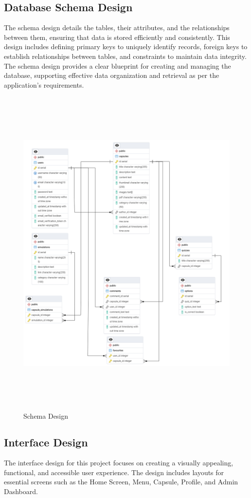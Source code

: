 \subsection{Database Schema Design}
The schema design details the tables, their attributes, and the relationships between them, ensuring that data is stored efficiently and consistently. This design includes defining primary keys to uniquely identify records, foreign keys to establish relationships between tables, and constraints to maintain data integrity. The schema design provides a clear blueprint for creating and managing the database, supporting effective data organization and retrieval as per the application’s requirements.
\begin{figure}[H]
   \centering
    \includegraphics[height = 17cm]{Diagrams/Schema Design.png}
    \caption{Schema Design}
\end{figure}
\newpage
\subsection{Interface Design}
The interface design for this project focuses on creating a visually appealing, functional, and accessible user experience. The design includes layouts for essential screens such as the Home Screen, Menu, Capsule, Profile, and Admin Dashboard.


